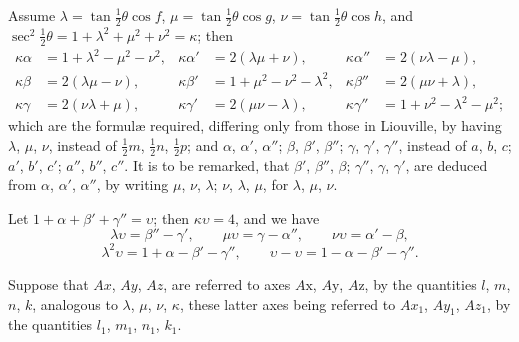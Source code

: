 \documentclass[11pt]{article}
\begin{document}
Assume $\lambda = \tan\tfrac12\theta \cos f$, $\mu = \tan\tfrac12\theta \cos g$, $\nu = \tan\tfrac12\theta \cos h$, and $\sec^2 \tfrac12\theta = 1 + \lambda^2 + \mu^2 + \nu^2 = \kappa$;
then
\[
\begin{aligned}
\kappa\alpha   &= 1 + \lambda^2 - \mu^2 - \nu^2,    & \kappa\alpha'   &= 2(\lambda\mu + \nu),     & \kappa\alpha''  &= 2(\nu\lambda - \mu), \\
\kappa\beta    &= 2(\lambda\mu - \nu),               & \kappa\beta'    &= 1 + \mu^2 - \nu^2 - \lambda^2, & \kappa\beta''  &= 2(\mu\nu + \lambda), \\
\kappa\gamma   &= 2(\nu\lambda + \mu),               & \kappa\gamma'   &= 2(\mu\nu - \lambda),     & \kappa\gamma'' &= 1 + \nu^2 - \lambda^2 - \mu^2;
\end{aligned}
\]
which are the formul\ae{} required, differing only from those in Liouville, by having $\lambda$, $\mu$, $\nu$, instead of $\tfrac12 m$, $\tfrac12 n$, $\tfrac12 p$; and $\alpha$, $\alpha'$, $\alpha''$; $\beta$, $\beta'$, $\beta''$; $\gamma$, $\gamma'$, $\gamma''$, instead of $a$, $b$, $c$; $a'$, $b'$, $c'$; $a''$, $b''$, $c''$. It is to be remarked, that $\beta'$, $\beta''$, $\beta$; $\gamma''$, $\gamma$, $\gamma'$, are deduced from $\alpha$, $\alpha'$, $\alpha''$, by writing $\mu$, $\nu$, $\lambda$; $\nu$, $\lambda$, $\mu$, for $\lambda$, $\mu$, $\nu$.

Let $1 + \alpha + \beta' + \gamma'' = \upsilon$; then $\kappa\upsilon = 4$, and we have
\[
\lambda \upsilon = \beta'' - \gamma', \qquad \mu\upsilon = \gamma - \alpha'', \qquad \nu\upsilon = \alpha' - \beta,
\]
\[
\lambda^2 \upsilon = 1 + \alpha - \beta' - \gamma'', \qquad \upsilon - \upsilon = 1 - \alpha - \beta' - \gamma''.
\]

Suppose that $Ax$, $Ay$, $Az$, are referred to axes $A\mathrm{x}$, $A\mathrm{y}$, $A\mathrm{z}$, by the quantities $l$, $m$, $n$, $k$, analogous to $\lambda$, $\mu$, $\nu$, $\kappa$, these latter axes being referred to $Ax_1$, $Ay_1$, $Az_1$, by the quantities $l_1$, $m_1$, $n_1$, $k_1$.
\end{document}
